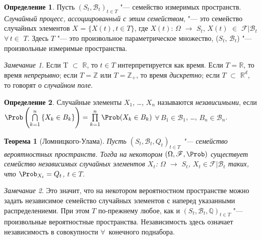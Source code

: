 \documentclass[a4paper]{article}
\theoremstyle{plain}
\newtheorem{thm}{Теорема}[section]
\theoremstyle{definition}
\newtheorem{defn}{Определение}[section]
\theoremstyle{remark}
\newtheorem*{rem}{Замечание}
\begin{document}
\begin{defn}
  Пусть $(S_{t}, \mathscr{B}_{t})_{t \in T}$ "--- семейство измеримых пространств. \emph{Случайный процесс, ассоциированный с этим семейством}, "--- это семейство случайных элементов $X$ = $\lbrace X(t){,} t \in T \rbrace$, где $X(t)$: $\Omega$ $\rightarrow$ $S_{t}$, $X(t)$ $\in$ $\mathscr{F}|\mathscr{B}_{t}$ \linebreak $\forall\,t \in$ $T$. Здесь $T$ "--- это произвольное параметрическое множество, ($S_{t}$, $\mathscr{B}_{t}$) "--- произвольные измеримые пространства.
\end{defn}

\begin{rem}
  Если T $\subset$ $\mathbb{R}$, то $t \in T$ интерпретируется как время. Если \linebreak $T = \mathbb{R}$, то время \emph{непрерывно}; если $T = \mathbb{Z}$ или $T = \mathbb{Z}_{+}$, то время \emph{дискретно}; если $T$ $\subset$ $\mathbb{R}^{d}$, то говорят о \emph{случайном поле}.
\end{rem}

\begin{defn}
  Случайные элементы $X_{1}$, \ldots, $X_{n}$ называются \emph{независимыми}, если $\Prob\left(\bigcap\limits_{k=1}^n \left\lbrace X_{k} \in  B_{k}\right\rbrace \right) = \prod\limits_{k=1}^n \Prob(X_{k} \in B_{k})$  $\forall\, B_{1} \in \mathscr{B}_{1}$, \ldots, $B_{n} \in \mathscr{B}_{n}$.
\end{defn}

\begin{thm}[Ломницкого-Улама]
  Пусть $(S_{t}, \mathscr{B}_{t}, Q_{t})_{t \in  T}$ "--- семейство вероятностных пространств. Тогда на некотором $(\Omega, \mathscr{F}, \Prob)$ существует семейство \emph{независимых} случайных элементов $X_{t}$: $\Omega$ $\rightarrow$ $S_{t}$, $X_{t} \in \mathscr{F}|\mathscr{B}_{t}$ таких, что $\Prob_{X_{t}} = Q_{t}$, $t \in T$.
\end{thm}

\begin{rem}
  \sloppy
  Это значит, что на некотором вероятностном пространстве можно задать независимое семейство случайных элементов с наперед указанными распределениеми. При этом $T$ по-прежнему любое, как и $(S_{t}, \mathscr{B}_{t}, \mathbb{Q})_{t \in T}$ "--- произвольные вероятностные пространства. Независимость здесь означает независимость в совокупности $\forall\,$ конечного поднабора.
\end{rem}
\end{document}
